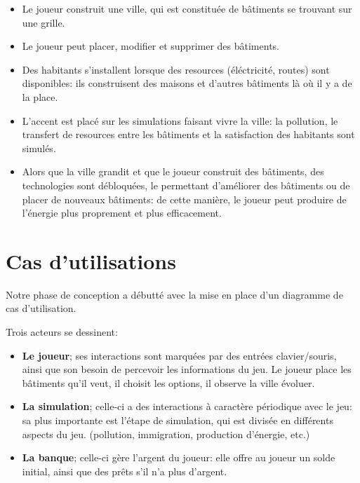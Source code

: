 \documentclass[12pt]{article}
\begin{document}
\begin{itemize}
    \item Le joueur construit une ville, qui est constituée de bâtiments se trouvant sur une grille.
    \item Le joueur peut placer, modifier et supprimer des bâtiments.
    \item Des habitants s'installent lorsque des resources (éléctricité, routes) sont disponibles: ils construisent des maisons et d'autres bâtiments là où il y a de la place.
    \item L'accent est placé sur les simulations faisant vivre la ville: la pollution, le transfert de resources entre les bâtiments et la satisfaction des habitants sont simulés.
    \item Alors que la ville grandit et que le joueur construit des bâtiments, des technologies sont débloquées, le permettant d'améliorer des bâtiments ou de placer de nouveaux bâtiments: de cette manière, le joueur peut produire de l'énergie plus proprement et plus efficacement.
\end{itemize}

\section{Cas d'utilisations}
\label{sec:usecase}

Notre phase de conception a débutté avec la mise en place d'un diagramme de cas d'utilisation.

Trois acteurs se dessinent:

\begin{itemize}
    \item \textbf{Le joueur}; ses interactions sont marquées par des entrées clavier/souris, ainsi que son besoin de percevoir les informations du jeu. Le joueur place les bâtiments qu'il veut, il choisit les options, il observe la ville évoluer.
    \item \textbf{La simulation}; celle-ci a des interactions à caractère périodique avec le jeu: sa plus importante est l'étape de simulation, qui est divisée en différents aspects du jeu. (pollution, immigration, production d'énergie, etc.)
    \item \textbf{La banque}; celle-ci gère l'argent du joueur: elle offre au joueur un solde initial, ainsi que des prêts s'il n'a plus d'argent.
\end{itemize}

\newpage
\end{document}
